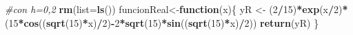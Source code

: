 \documentclass[]{article}
\newenvironment{Shaded}{\begin{snugshade}}{\end{snugshade}}
\newcommand{\KeywordTok}[1]{\textcolor[rgb]{0.13,0.29,0.53}{\textbf{#1}}}
\newcommand{\DataTypeTok}[1]{\textcolor[rgb]{0.13,0.29,0.53}{#1}}
\newcommand{\DecValTok}[1]{\textcolor[rgb]{0.00,0.00,0.81}{#1}}
\newcommand{\StringTok}[1]{\textcolor[rgb]{0.31,0.60,0.02}{#1}}
\newcommand{\CommentTok}[1]{\textcolor[rgb]{0.56,0.35,0.01}{\textit{#1}}}
\newcommand{\ControlFlowTok}[1]{\textcolor[rgb]{0.13,0.29,0.53}{\textbf{#1}}}
\newcommand{\OperatorTok}[1]{\textcolor[rgb]{0.81,0.36,0.00}{\textbf{#1}}}
\newcommand{\NormalTok}[1]{#1}
\begin{document}
\begin{Shaded}
\begin{Highlighting}[]
\CommentTok{#con h=0,2}
\KeywordTok{rm}\NormalTok{(}\DataTypeTok{list=}\KeywordTok{ls}\NormalTok{())}
\NormalTok{funcionReal<-}\ControlFlowTok{function}\NormalTok{(x)\{}
\NormalTok{  yR <-}\StringTok{ }\NormalTok{(}\DecValTok{2}\OperatorTok{/}\DecValTok{15}\NormalTok{)}\OperatorTok{*}\KeywordTok{exp}\NormalTok{(x}\OperatorTok{/}\DecValTok{2}\NormalTok{)}\OperatorTok{*}\NormalTok{(}\DecValTok{15}\OperatorTok{*}\KeywordTok{cos}\NormalTok{((}\KeywordTok{sqrt}\NormalTok{(}\DecValTok{15}\NormalTok{)}\OperatorTok{*}\NormalTok{x)}\OperatorTok{/}\DecValTok{2}\NormalTok{)}\OperatorTok{-}\DecValTok{2}\OperatorTok{*}\KeywordTok{sqrt}\NormalTok{(}\DecValTok{15}\NormalTok{)}\OperatorTok{*}\KeywordTok{sin}\NormalTok{((}\KeywordTok{sqrt}\NormalTok{(}\DecValTok{15}\NormalTok{)}\OperatorTok{*}\NormalTok{x)}\OperatorTok{/}\DecValTok{2}\NormalTok{))}
  \KeywordTok{return}\NormalTok{(yR)}
\NormalTok{\}}


\end{Highlighting}
\end{Shaded}
\end{document}

